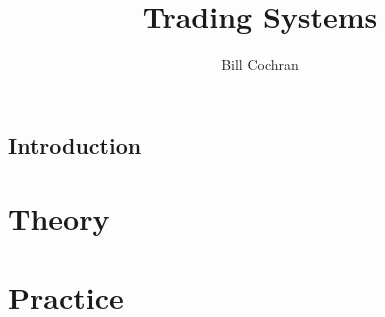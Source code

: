 \documentclass{book}
\title{Trading Systems}
\author{Bill Cochran}
\begin{document}
\maketitle

\tableofcontents

\chapter{Introduction}


\part{Theory}




 

\part{Practice}
\end{document}
